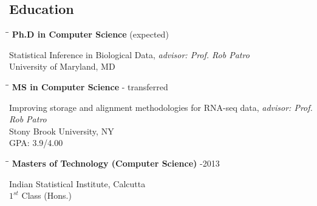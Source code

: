 \documentclass{res}
\begin{document}
\begin{resume}

\section{Education}          
  \vspace{-0.1in}	
   \begin{tabbing}
   \hspace{2.3in}\= \hspace{2.6in}\= \kill %
    {\bf Ph.D in Computer Science} \>    (expected)
   \end{tabbing}  \vspace{-20pt}      %
       Statistical Inference in Biological Data, {\it advisor: Prof. Rob Patro}  \\        
       University of Maryland, MD     
       
\vspace{-0.1in}	
   \begin{tabbing}
   \hspace{2.3in}\= \hspace{2.6in}\= \kill %
     {\bf MS in Computer Science} \>     - transferred
   \end{tabbing}  \vspace{-20pt}      %
        Improving storage and alignment methodologies for RNA-seq data, {\it advisor: Prof. Rob Patro}  \\        
       Stony Brook University, NY     \\
       GPA: 3.9/4.00
 
 \vspace{-0.1in}	
   \begin{tabbing}
   \hspace{2.3in}\= \hspace{2.6in}\= \kill %
     {\bf Masters of Technology (Computer Science)}  \>     -2013 
   \end{tabbing}  \vspace{-20pt}      %
       Indian Statistical Institute, Calcutta   \\
       $1^{st}$ Class (Hons.) 



\end{resume}
\end{document}
